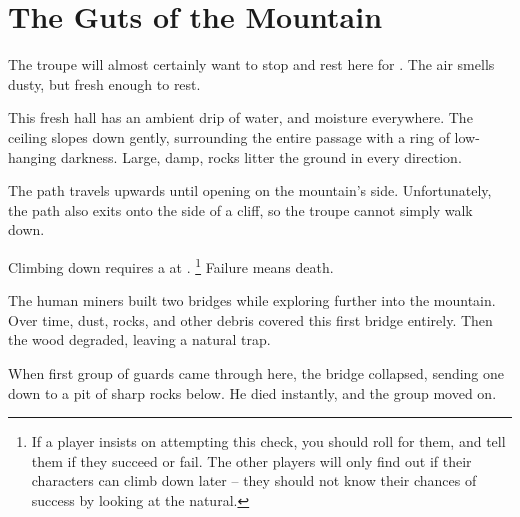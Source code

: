 \section{The Guts of the Mountain}

\begin{multicols}{2}

\renewcommand\npcsymbol{\glsentrysymbol{yonder}}

The troupe will almost certainly want to stop and rest here for .
The air smells dusty, but fresh enough to rest.

\begin{boxtext}
  This fresh hall has an ambient drip of water, and moisture everywhere.
  The ceiling slopes down gently, surrounding the entire passage with a ring of low-hanging darkness.
  Large, damp, rocks litter the ground in every direction.
\end{boxtext}






The path travels upwards until opening on the mountain's side.
Unfortunately, the path also exits onto the side of a cliff, so the troupe cannot simply walk down.

Climbing down requires a  at \tn[14].%
\footnote{If a player insists on attempting this check, you should roll for them, and tell them if they succeed or fail.  The other players will only find out if their characters can climb down later -- they should not know their chances of success by looking at the \gls{natural}.}
Failure means death.


\begin{exampletext}
  The human miners built two bridges while exploring further into the mountain.
  Over time, dust, rocks, and other debris covered this first bridge entirely.
  Then the wood degraded, leaving a natural trap.

  When first group of \glspl{guard} came through here, the bridge collapsed, sending one down to a pit of sharp rocks below.
  He died instantly, and the group moved on.
\end{exampletext}


\end{multicols}
